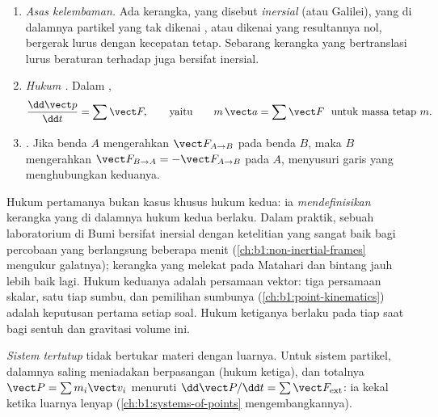 \begin{theorem}\label{thm:b1:newton-dynamics:laws}
\begin{enumerate}
  \item \emph{Asas kelembaman.} Ada kerangka, yang disebut
        \emph{inersial} (atau Galilei), yang di dalamnya partikel yang
        tak dikenai , atau dikenai  yang resultannya nol,
        bergerak lurus dengan kecepatan tetap. Sebarang kerangka yang
        bertranslasi lurus beraturan terhadap  juga
        bersifat inersial.
  \item \emph{Hukum .} Dalam ,
        \[
        \frac{\dd\vect p}{\dd t} = \sum\vect F, \qquad \text{yaitu}\qquad
        m\,\vect a = \sum\vect F \ \text{ untuk massa tetap } m .
        \]
  \item \emph{.} Jika benda $A$ mengerahkan
        $\vect F_{A\to B}$ pada benda $B$, maka $B$ mengerahkan
        $\vect F_{B\to A} = -\vect F_{A\to B}$ pada $A$, menyusuri garis
        yang menghubungkan keduanya.
\end{enumerate}
\end{theorem}
\admitted

\begin{remark}\label{rem:b1:newton-dynamics:meaning}
Hukum pertamanya bukan kasus khusus hukum kedua: ia
\emph{mendefinisikan} kerangka yang di dalamnya hukum kedua berlaku.
Dalam praktik, sebuah laboratorium di Bumi bersifat inersial dengan
ketelitian yang sangat baik bagi percobaan yang berlangsung beberapa
menit (\cref{ch:b1:non-inertial-frames} mengukur galatnya); kerangka
yang melekat pada Matahari dan bintang jauh lebih baik lagi. Hukum
keduanya adalah persamaan vektor: tiga persamaan skalar, satu tiap
sumbu, dan pemilihan sumbunya (\cref{ch:b1:point-kinematics}) adalah
keputusan pertama setiap soal. Hukum ketiganya berlaku pada tiap saat
bagi  sentuh dan  gravitasi volume ini.
\end{remark}

\begin{definition}\label{def:b1:newton-dynamics:conservation}
\emph{Sistem tertutup} tidak bertukar materi dengan luarnya. Untuk
sistem partikel,  dalamnya saling meniadakan berpasangan (hukum
ketiga), dan  totalnya $\vect P = \sum m_i\vect v_i$ menuruti
$\dd\vect P/\dd t = \sum\vect F_{\mathrm{ext}}$: ia kekal ketika 
luarnya lenyap (\cref{ch:b1:systems-of-points} mengembangkannya).
\end{definition}

